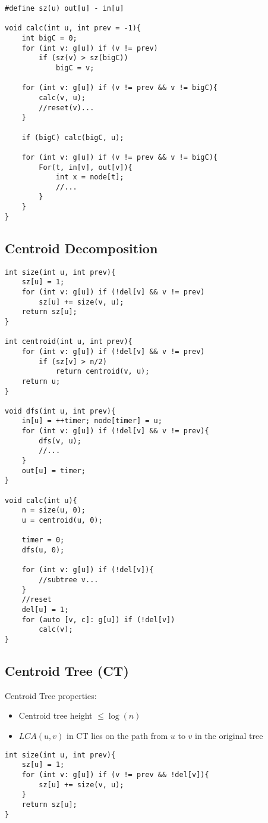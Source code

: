 \documentclass[11pt,a4paper]{article}
\begin{document}
\begin{multicols*}{2}
\begin{lstlisting}
#define sz(u) out[u] - in[u]
 
void calc(int u, int prev = -1){
	int bigC = 0;
	for (int v: g[u]) if (v != prev)
		if (sz(v) > sz(bigC))
			bigC = v;
	
	for (int v: g[u]) if (v != prev && v != bigC){
        calc(v, u);
        //reset(v)...
    }
		
	if (bigC) calc(bigC, u);
	
	for (int v: g[u]) if (v != prev && v != bigC){
		For(t, in[v], out[v]){
			int x = node[t];
			//...
		}
	}
}
\end{lstlisting}

\subsection{Centroid Decomposition}
\begin{lstlisting}
int size(int u, int prev){
	sz[u] = 1;
	for (int v: g[u]) if (!del[v] && v != prev)
		sz[u] += size(v, u);
	return sz[u];
}

int centroid(int u, int prev){
	for (int v: g[u]) if (!del[v] && v != prev)
		if (sz[v] > n/2)
			return centroid(v, u);
	return u;
}

void dfs(int u, int prev){
    in[u] = ++timer; node[timer] = u;
    for (int v: g[u]) if (!del[v] && v != prev){
        dfs(v, u);
        //...
    }
    out[u] = timer;
}

void calc(int u){
	n = size(u, 0);
	u = centroid(u, 0);
	
	timer = 0;
	dfs(u, 0);
	
    for (int v: g[u]) if (!del[v]){
        //subtree v...
    }
    //reset
	del[u] = 1;
	for (auto [v, c]: g[u]) if (!del[v])
		calc(v);
}
\end{lstlisting}

\subsection{Centroid Tree (CT)}
Centroid Tree properties:
\begin{itemize}
    \item Centroid tree height $ \leq \log(n) $
    \item $LCA(u, v)$ in CT lies on the path from $u$ to $v$ in the original tree
\end{itemize}


\begin{lstlisting}
int size(int u, int prev){
	sz[u] = 1;
	for (int v: g[u]) if (v != prev && !del[v]){
		sz[u] += size(v, u);
	}
    return sz[u];
}
 

\end{lstlisting}
\end{multicols*}
\end{document}
